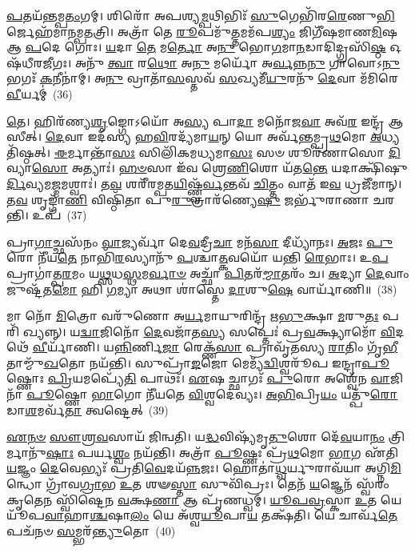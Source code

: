\-\ul{𑌪}\-𑌤𑌯᳴𑌨𑍍𑌤𑌮𑍍𑌪\-\ul{𑌤𑌂}\-𑌗𑌮𑍍। 𑌶𑌿𑌰𑍋᳴ 𑌅𑌪𑌶𑍍𑌯\-\ul{𑌮𑍍𑌪}\-𑌥𑌿𑌭𑌿𑌃᳴ \ul{𑌸𑍁}\-𑌗𑍇𑌭𑌿᳴𑌰\-\ul{𑌰𑍇}\-𑌣𑍁\-\ul{𑌭𑌿}\-𑌰𑍍𑌜𑍇𑌹᳴𑌮𑌾𑌨𑌮𑍍𑌪\-\ul{𑌤}\-𑌤𑍍𑌰𑌿। 𑌅𑌤𑍍𑌰𑌾᳴ 𑌤𑍇 \ul{𑌰𑍂}\-𑌪𑌮𑍁᳴\-\ul{𑌤𑍍𑌤}\-𑌮𑌮᳴𑌪\-\ul{𑌶𑍍𑌯𑌂} 𑌜𑌿𑌗𑍀᳴𑌷𑌮𑌾𑌣\-\ul{𑌮𑌿}\-𑌷 𑌆 \ul{𑌪}\-𑌦𑍇 𑌗𑍋𑌃। \ul{𑌯}\-𑌦𑌾 \ul{𑌤𑍇} 𑌮\-\ul{𑌰𑍍𑌤𑍋} 𑌅\-\ul{𑌨𑍁} 𑌭𑍋\-\ul{𑌗}\-𑌮𑌾\-\ul{𑌨}\-𑌡𑌾𑌦𑌿𑌦𑍍𑌗𑍍𑌰𑌸𑌿᳴\-\ul{𑌷𑍍𑌠} 𑌓𑌷᳴𑌧𑍀𑌰𑌜𑍀𑌗𑌃। 𑌅𑌨𑍁᳴ \ul{𑌤𑍍𑌵𑌾} 𑌰\-\ul{𑌥𑍋} 𑌅\-\ul{𑌨𑍁} 𑌮𑌰𑍍𑌯𑍋᳴ 𑌅\-\ul{𑌰𑍍𑌵}\-𑌨𑍍𑌨\-\ul{𑌨𑍁} 𑌗𑌾𑌵𑍋\-𑌽\-\ul{𑌨𑍁} 𑌭𑌗𑌃᳴ \ul{𑌕}\-𑌨𑍀𑌨𑌾॑𑌮𑍍। 𑌅\-\ul{𑌨𑍁} 𑌵𑍍𑌰𑌾𑌤𑌾᳴\-\ul{𑌸}\-𑌸𑍍𑌤𑌵᳴ \ul{𑌸}\-𑌖𑍍𑌯𑌮𑍀᳴\-\ul{𑌯𑍁}\-𑌰𑌨𑍁᳴ \ul{𑌦𑍇}\-𑌵𑌾 𑌮᳴𑌮𑌿𑌰𑍇 \ul{𑌵𑍀}\-𑌰𑍍𑌯𑌮𑍍॑~(36)

\-\ul{𑌤𑍇}\-। 𑌹𑌿𑌰᳴𑌣𑍍𑌯\-\ul{𑌶𑍃}\-𑌙𑍍𑌗𑍋\-𑌽𑌯𑍋᳴ 𑌅\-\ul{𑌸𑍍𑌯} 𑌪𑌾\-\ul{𑌦𑌾} 𑌮𑌨𑍋᳴𑌜\-\ul{𑌵𑌾} 𑌅𑌵᳴\-\ul{𑌰} 𑌇𑌨𑍍𑌦𑍍𑌰᳴ 𑌆𑌸𑍀𑌤𑍍। \ul{𑌦𑍇}\-𑌵𑌾 𑌇𑌦᳴𑌸𑍍𑌯 𑌹\-\ul{𑌵𑌿}\-𑌰𑌦𑍍𑌯᳴𑌮𑌾\-\ul{𑌯}\-𑌨𑍍 𑌯𑍋 𑌅𑌰𑍍𑌵᳴𑌨𑍍𑌤𑌮𑍍𑌪𑍍𑌰\-\ul{𑌥}\-𑌮𑍋 \ul{𑌅}\-𑌧𑍍𑌯𑌤𑌿᳴𑌷𑍍𑌠𑌤𑍍। \ul{𑌈}\-𑌰𑍍𑌮𑌾𑌨𑍍𑌤𑌾᳴\-\ul{𑌸𑌃} 𑌸𑌿𑌲𑌿᳴𑌕𑌮𑌧𑍍𑌯𑌮𑌾\-\ul{𑌸𑌃} 𑌸𑍞 𑌶𑍂𑌰᳴𑌣𑌾𑌸𑍋 \ul{𑌦𑌿}\-𑌵𑍍𑌯𑌾\-\ul{𑌸𑍋} 𑌅𑌤𑍍𑌯𑌾𑌃॑। \ul{𑌹}\-\-\ul{𑍞}\-𑌸𑌾 𑌇᳴𑌵 𑌶𑍍𑌰𑍇\-\ul{𑌣𑌿}\-𑌶𑍋 𑌯᳴𑌤\-\ul{𑌨𑍍𑌤𑍇} 𑌯𑌦𑌾𑌕𑍍𑌷𑌿᳴𑌷𑍁\-\ul{𑌰𑍍𑌦𑌿}\-𑌵𑍍𑌯𑌮\-\ul{𑌜𑍍𑌮}\-𑌮𑌶𑍍𑌵𑌾𑌃॑। 𑌤\-\ul{𑌵} 𑌶𑌰𑍀᳴𑌰𑌮𑍍𑌪𑌤\-\ul{𑌯𑌿}\-𑌷𑍍𑌣𑍍𑌵᳴\-\ul{𑌰𑍍𑌵}\-𑌨𑍍𑌤𑌵᳴ \ul{𑌚𑌿}\-𑌤𑍍𑌤𑌂 𑌵𑌾𑌤᳴ 𑌇\-\ul{𑌵} 𑌧𑍍𑌰𑌜𑍀᳴𑌮𑌾𑌨𑍍। 𑌤\-\ul{𑌵} 𑌶𑍃𑌙𑍍𑌗𑌾᳴\-\ul{𑌣𑌿} 𑌵𑌿𑌷𑍍𑌠𑌿᳴𑌤𑌾 𑌪𑍁\-\ul{𑌰𑍁}\-𑌤𑍍𑌰𑌾𑌰᳴𑌣𑍍𑌯𑍇\-\ul{𑌷𑍁} 𑌜𑌰𑍍𑌭𑍁᳴𑌰𑌾𑌣𑌾 𑌚𑌰𑌨𑍍𑌤𑌿। 𑌉𑌪᳴~(37)

𑌪𑍍𑌰𑌾\-\ul{𑌗𑌾}\-𑌚𑍍𑌛𑌸᳴𑌨𑌂 \ul{𑌵𑌾}\-𑌜𑍍𑌯𑌰𑍍𑌵𑌾᳴ 𑌦𑍇\-\ul{𑌵}\-𑌦𑍍𑌰𑍀\-\ul{𑌚𑌾} 𑌮𑌨᳴\-\ul{𑌸𑌾} 𑌦𑍀𑌧𑍍𑌯𑌾᳴𑌨𑌃। \ul{𑌅}\-𑌜𑌃 \ul{𑌪𑍁}\-𑌰𑍋 𑌨𑍀᳴𑌯\-\ul{𑌤𑍇} 𑌨𑌾𑌭𑌿᳴\-\ul{𑌰}\-𑌸𑍍𑌯𑌾𑌨𑍁᳴ \ul{𑌪}\-𑌶𑍍𑌚𑌾\-\ul{𑌤𑍍𑌕}\-𑌵𑌯𑍋᳴ 𑌯𑌨𑍍𑌤𑌿 \ul{𑌰𑍇}\-𑌭𑌾𑌃। 𑌉\-\ul{𑌪} 𑌪𑍍𑌰𑌾𑌗𑌾॑𑌤𑍍𑌪\-\ul{𑌰}\-𑌮𑌂 𑌯\-\ul{𑌥𑍍𑌸}\-𑌧\-\ul{𑌸𑍍𑌥}\-𑌮\-\ul{𑌰𑍍𑌵𑌾}\-\-\ul{𑍞} 𑌅𑌚𑍍𑌛𑌾᳴ \ul{𑌪𑌿}\-𑌤𑌰᳴\-\ul{𑌮𑍍𑌮𑌾}\-𑌤𑌰𑌂᳴ 𑌚। \ul{𑌅}\-𑌦𑍍𑌯𑌾 \ul{𑌦𑍇}\-𑌵𑌾𑌂 𑌜𑍁𑌷𑍍𑌟᳴𑌤\-\ul{𑌮𑍋} 𑌹𑌿 \ul{𑌗}\-𑌮𑍍𑌯𑌾 𑌅𑌥𑌾 𑌶𑌾॑𑌸𑍍𑌤𑍇 \ul{𑌦𑌾}\-𑌶𑍁\-\ul{𑌷𑍇} 𑌵𑌾𑌰𑍍𑌯𑌾᳴𑌣𑌿॥~(38)

{\anuvakamend[{𑌵𑌿𑌪𑍃᳴𑌕𑍍𑌤𑍋 \ul{𑌦𑌿}\-𑌵𑌾 \ul{𑌵𑍀}\-𑌰𑍍𑌯᳴𑌮𑍁𑌪𑍈\-\ul{𑌕𑌾}\-𑌨𑍍𑌨𑌚᳴𑌤𑍍𑌵𑌾\-\ul{𑌰𑌿}\-\-\ul{𑍞}\-𑌶𑌚𑍍𑌚᳴}]}%

𑌮𑌾 𑌨𑍋᳴ \ul{𑌮𑌿}\-𑌤𑍍𑌰𑍋 𑌵𑌰𑍁᳴𑌣𑍋 𑌅\-\ul{𑌰𑍍𑌯}\-𑌮𑌾𑌯𑍁𑌰𑌿𑌨𑍍𑌦𑍍𑌰᳴ 𑌋\-\ul{𑌭𑍁}\-𑌕𑍍𑌷𑌾 \ul{𑌮}\-𑌰𑍁\-\ul{𑌤𑌃} 𑌪𑌰𑌿᳴ 𑌖𑍍𑌯𑌨𑍍𑌨𑍍। 𑌯\-\ul{𑌦𑍍𑌵𑌾}\-𑌜𑌿𑌨𑍋᳴ \ul{𑌦𑍇}\-𑌵𑌜𑌾᳴𑌤\-\ul{𑌸𑍍𑌯} 𑌸𑌪𑍍𑌤𑍇𑌃॑ 𑌪𑍍𑌰\-\ul{𑌵}\-𑌕𑍍𑌷𑍍𑌯𑌾𑌮𑍋᳴ \ul{𑌵𑌿}\-𑌦𑌥𑍇᳴ \ul{𑌵𑍀}\-𑌰𑍍𑌯𑌾᳴𑌣𑌿। 𑌯\-\ul{𑌨𑍍𑌨𑌿}\-𑌰𑍍𑌣𑌿\-\ul{𑌜𑌾} 𑌰𑍇𑌕𑍍𑌣᳴\-\ul{𑌸𑌾} 𑌪𑍍𑌰𑌾𑌵𑍃᳴𑌤𑌸𑍍𑌯 \ul{𑌰𑌾}\-𑌤𑌿𑌂 𑌗𑍃᳴\-\ul{𑌭𑍀}\-𑌤𑌾𑌮𑍍𑌮𑍁᳴\-\ul{𑌖}\-𑌤𑍋 𑌨𑌯᳴𑌨𑍍𑌤𑌿। 𑌸𑍁𑌪𑍍𑌰𑌾᳴\-\ul{𑌙}\-𑌜𑍋 𑌮𑍇𑌮𑍍𑌯᳴\-\ul{𑌦𑍍𑌵𑌿}\-𑌶𑍍𑌵𑌰𑍂᳴𑌪 𑌇𑌨𑍍𑌦𑍍𑌰𑌾\-\ul{𑌪𑍂}\-𑌷𑍍𑌣𑍋𑌃 \ul{𑌪𑍍𑌰𑌿}\-𑌯𑌮𑌪𑍍𑌯𑍇᳴\-\ul{𑌤𑌿} 𑌪𑌾𑌥𑌃᳴। \ul{𑌏}\-𑌷 𑌚𑍍𑌛𑌾𑌗𑌃᳴ \ul{𑌪𑍁}\-𑌰𑍋 𑌅𑌶𑍍𑌵𑍇᳴𑌨 \ul{𑌵𑌾}\-𑌜𑌿𑌨𑌾᳴ \ul{𑌪𑍂}\-𑌷𑍍𑌣𑍋 \ul{𑌭𑌾}\-𑌗𑍋 𑌨𑍀᳴𑌯𑌤𑍇 \ul{𑌵𑌿}\-𑌶𑍍𑌵𑌦𑍇॑𑌵𑍍𑌯𑌃। \ul{𑌅}\-\-\ul{𑌭𑌿}\-𑌪𑍍𑌰𑌿\-\ul{𑌯𑌂} 𑌯𑌤𑍍𑌪𑍁᳴\-\ul{𑌰𑍋}\-𑌡𑌾\-\ul{𑌶}\-𑌮𑌰𑍍𑌵᳴\-\ul{𑌤𑌾} 𑌤𑍍𑌵𑌷𑍍𑌟𑍇𑌤𑍍~(39)

\-\ul{𑌏}\-\-\ul{𑌨}\-\-\ul{𑍞} \ul{𑌸𑍗}\-\-\ul{𑌶𑍍𑌰}\-\-\ul{𑌵}\-𑌸𑌾𑌯᳴ 𑌜𑌿𑌨𑍍𑌵𑌤𑌿। 𑌯\-\ul{𑌦𑍍𑌧}\-𑌵𑌿𑌷𑍍𑌯᳴𑌮𑍃\-\ul{𑌤𑍁}\-𑌶𑍋 𑌦𑍇᳴\-\ul{𑌵}\-𑌯𑌾\-\ul{𑌨𑌂} 𑌤𑍍𑌰𑌿𑌰𑍍𑌮𑌾𑌨𑍁᳴\-\ul{𑌷𑌾𑌃} 𑌪𑌰𑍍𑌯\-\ul{𑌶𑍍𑌵𑌂} 𑌨𑌯᳴𑌨𑍍𑌤𑌿। 𑌅𑌤𑍍𑌰𑌾᳴ \ul{𑌪𑍂}\-𑌷𑍍𑌣𑌃 𑌪𑍍𑌰᳴\-\ul{𑌥}\-𑌮𑍋 \ul{𑌭𑌾}\-𑌗 𑌏᳴𑌤𑌿 \ul{𑌯}\-𑌜𑍍𑌞𑌂 \ul{𑌦𑍇}\-𑌵𑍇𑌭𑍍𑌯𑌃᳴ 𑌪𑍍𑌰𑌤𑌿\-\ul{𑌵𑍇}\-𑌦𑌯᳴\-\ul{𑌨𑍍𑌨}\-𑌜𑌃। 𑌹𑍋𑌤𑌾॑\-\ul{𑌧𑍍𑌵}\-𑌰𑍍𑌯𑍁𑌰𑌾𑌵᳴𑌯𑌾 𑌅𑌗𑍍𑌨𑌿\-\ul{𑌮𑌿}\-𑌨𑍍𑌧𑍋 𑌗𑍍𑌰𑌾᳴𑌵\-\ul{𑌗𑍍𑌰𑌾}\-𑌭 \ul{𑌉}\-𑌤 𑌶𑍟\-\ul{𑌸𑍍𑌤𑌾} 𑌸𑍁𑌵𑌿᳴𑌪𑍍𑌰𑌃। 𑌤𑍇𑌨᳴ \ul{𑌯}\-𑌜𑍍𑌞𑍇𑌨᳴ 𑌸𑍍𑌵᳴𑌰𑌂 𑌕𑍃𑌤𑍇\-\ul{𑌨} 𑌸𑍍𑌵𑌿᳴𑌷𑍍𑌟𑍇𑌨 \ul{𑌵}\-𑌕𑍍𑌷\-\ul{𑌣𑌾} 𑌆 𑌪𑍃᳴𑌣𑌧𑍍𑌵𑌮𑍍। \ul{𑌯𑍂}\-\-\ul{𑌪}\-\-\ul{𑌵𑍍𑌰}\-𑌸𑍍𑌕𑌾 \ul{𑌉}\-𑌤 𑌯𑍇 𑌯𑍂᳴𑌪\-\ul{𑌵𑌾}\-𑌹𑌾\-\ul{𑌶𑍍𑌚}\-𑌷𑌾\-\ul{𑌲𑌂} 𑌯𑍇 𑌅᳴𑌶𑍍𑌵\-\ul{𑌯𑍂}\-𑌪𑌾\-\ul{𑌯} 𑌤𑌕𑍍𑌷᳴𑌤𑌿। 𑌯𑍇 𑌚𑌾𑌰𑍍𑌵᳴\-\ul{𑌤𑍇} 𑌪𑌚᳴𑌨𑍞 \ul{𑌸}\-𑌮𑍍𑌭𑌰᳴\-\ul{𑌨𑍍𑌤𑍍𑌯𑍁}\-𑌤𑍋~(40)

